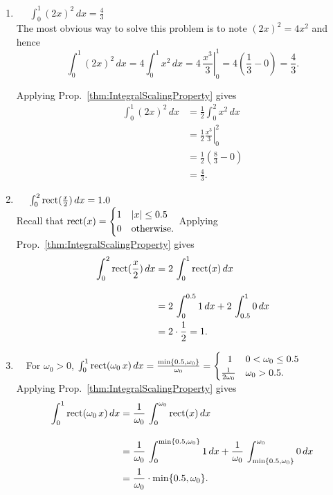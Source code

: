\begin{enumerate}
\renewcommand{\labelenumi}{(\alph{enumi})}
\setlength{\itemsep}{.2cm}
    \item \Ans ~~ $\int_0^1 (2x)^2 \, dx = \frac{4}{3}$\\

    The most obvious way to solve this problem is to note $(2x)^2 = 4 x^2$ and hence
    $$\int_0^1 (2x)^2 \, dx = 4 \int_0^1 x^2 \, dx = \left. 4 \, \frac{x^3}{3}\right|_0^1 = 4 \left( \frac{1}{3} - 0 \right) = \frac{4}{3}.$$

    Applying Prop.~\ref{thm:IntegralScalingProperty} gives
    \begin{align*}
        \int_0^1 (2x)^2 \, dx &= \frac{1}{2} \int_{0}^2 x^2 \, dx \\[1em]
        &= \left.\frac{1}{2} \frac{x^3}{3}\right|_0^2 \\[1em] 
        &= \frac{1}{2} \left( \frac{8}{3} - 0 \right) \\
        &= \frac{4}{3}.
    \end{align*}

     \item \Ans~~ $\int_0^2 \mathrm{rect}(\frac{x}{2})\, dx = 1.0$\\

     Recall that $\mathrm{rect}(x) = \begin{cases}
         1 & |x| \le 0.5 \\
         0 & \text{otherwise}.
     \end{cases}$ Applying Prop.~\ref{thm:IntegralScalingProperty} gives
    \begin{align*}
       \int_0^2  \mathrm{rect}(\frac{x}{2})\, dx &= 2 \, \int_{0}^1 \mathrm{rect}(x) \, dx \\[1em]
        &= 2\, \int_{0}^{0.5} 1 \, dx + 2\, \int_{0.5}^{1} 0 \, dx \\
        &=2 \cdot \frac{1}{2} =1.
    \end{align*}

     

      \item \Ans ~~For $\omega_0>0$, $\int_0^1 \rect(\omega_0\, x)\, dx = \frac{\min\{0.5,\omega_0 \}}{\omega_0} = \begin{cases} ~~ 1 & 0 < \omega_0 \le 0.5 \\ \frac{1}{2 \omega_0} & \omega_0 > 0.5.
          
      \end{cases}$\\

      Applying Prop.~\ref{thm:IntegralScalingProperty} gives
    \begin{align*}
     \int_0^1 \mathrm{rect}(\omega_0\, x)\, dx &= \frac{1}{\omega_0}\,  \int_{0}^{\omega_0} \mathrm{rect}(x) \, dx \\[1em]
        &= \frac{1}{\omega_0}\, \int_{0}^{\min\{0.5,\omega_0 \} } 1 \, dx + \frac{1}{\omega_0}\, \int_{\min\{0.5,\omega_0 \}}^{\omega_0} 0 \, dx \\
        &=\frac{1}{\omega_0} \cdot \min\{0.5,\omega_0 \}.
    \end{align*}


\end{enumerate}
